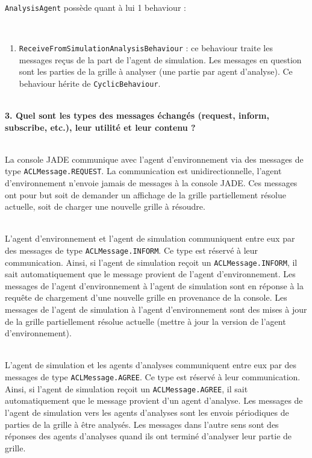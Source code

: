 \documentclass[11pt]{report}
\begin{document}
~\\
\verb|AnalysisAgent| possède quant à lui 1 behaviour : 

~\
\begin{enumerate}
\item \verb|ReceiveFromSimulationAnalysisBehaviour| : ce behaviour traite les messages reçus de la part de l'agent de simulation. Les messages en question sont les parties de la grille à analyser (une partie par agent d'analyse). Ce behaviour hérite de \verb|CyclicBehaviour|.
\end{enumerate}

~\\
\textbf{3. Quel sont les types des messages échangés (request, inform, subscribe, etc.), leur
utilité et leur contenu ?}

~\\
La console JADE communique avec l'agent d'environnement via des messages de type \verb|ACLMessage.REQUEST|. La communication est unidirectionnelle, l'agent d'environnement n'envoie jamais de messages à la console JADE. Ces messages ont pour but soit de demander un affichage de la grille partiellement résolue actuelle, soit de charger une nouvelle grille à résoudre.

~\\
L'agent d'environnement et l'agent de simulation communiquent entre eux par des messages de type \verb|ACLMessage.INFORM|. Ce type est réservé à leur communication. Ainsi, si l'agent de simulation reçoit un \verb|ACLMessage.INFORM|, il sait automatiquement que le message provient de l'agent d'environnement. Les messages de l'agent d'environnement à l'agent de simulation sont en réponse à la requête de chargement d'une nouvelle grille en provenance de la console. Les messages de l'agent de simulation à l'agent d'environnement sont des mises à jour de la grille partiellement résolue actuelle (mettre à jour la version de l'agent d'environnement).

~\\
L'agent de simulation et les agents d'analyses communiquent entre eux par des messages de type \verb|ACLMessage.AGREE|. Ce type est réservé à leur communication. Ainsi, si l'agent de simulation reçoit un \verb|ACLMessage.AGREE|, il sait automatiquement que le message provient d'un agent d'analyse. Les messages de l'agent de simulation vers les agents d'analyses sont les envois périodiques de parties de la grille à être analysés. Les messages dans l'autre sens sont des réponses des agents d'analyses quand ils ont terminé d'analyser leur partie de grille.
\end{document}
